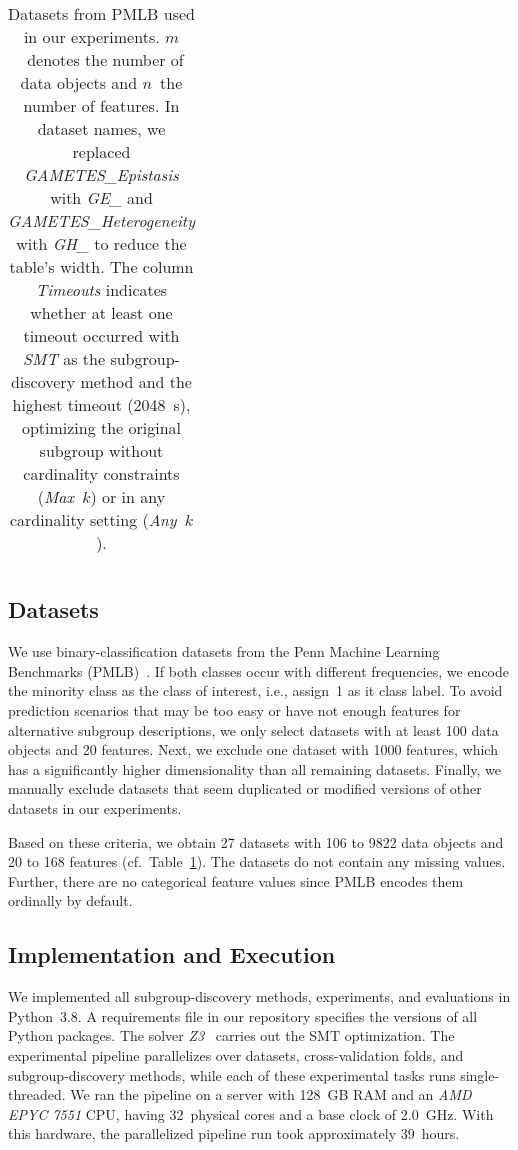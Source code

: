 \documentclass{article}
\theoremstyle{definition}
\begin{document}
\begin{table}[p]
\begin{tabular}{lrrll}
		\bottomrule
	\end{tabular}
	\caption{
		Datasets from PMLB used in our experiments.
		$m$~denotes the number of data objects and $n$~the number of features.
		In dataset names, we replaced \emph{GAMETES\_Epistasis} with  \emph{GE\_} and \emph{GAMETES\_Heterogeneity} with \emph{GH\_} to reduce the table's width.
		The column \emph{Timeouts} indicates whether at least one timeout occurred with \emph{SMT} as the subgroup-discovery method and the highest timeout (2048~s), optimizing the original subgroup without cardinality constraints (\emph{Max~$k$}) or in any cardinality setting (\emph{Any~$k$}).
	}
	\label{tab:csd:datasets}
\end{table}

\subsection{Datasets}
\label{sec:csd:experimental-design:datasets}

We use binary-classification datasets from the Penn Machine Learning Benchmarks (PMLB)~\cite{olson2017pmlb, romano2021pmlb}.
If both classes occur with different frequencies, we encode the minority class as the class of interest, i.e., assign~1 as it class label.
To avoid prediction scenarios that may be too easy or have not enough features for alternative subgroup descriptions, we only select datasets with at least 100 data objects and 20 features.
Next, we exclude one dataset with 1000 features, which has a significantly higher dimensionality than all remaining datasets.
Finally, we manually exclude datasets that seem duplicated or modified versions of other datasets in our experiments.

Based on these criteria, we obtain 27 datasets with 106 to 9822 data objects and 20 to 168 features (cf.~Table~\ref{tab:csd:datasets}).
The datasets do not contain any missing values.
Further, there are no categorical feature values since PMLB encodes them ordinally by default.

\subsection{Implementation and Execution}
\label{sec:csd:experimental-design:implementation}

We implemented all subgroup-discovery methods, experiments, and evaluations in Python~3.8.
A requirements file in our repository specifies the versions of all Python packages.
The solver \emph{Z3}~\cite{bjorner2015nuz, deMoura2008z3} carries out the SMT optimization.
The experimental pipeline parallelizes over datasets, cross-validation folds, and subgroup-discovery methods, while each of these experimental tasks runs single-threaded.
We ran the pipeline on a server with 128~GB RAM and an \emph{AMD EPYC 7551} CPU, having 32~physical cores and a base clock of 2.0~GHz.
With this hardware, the parallelized pipeline run took approximately 39~hours.
\end{document}
